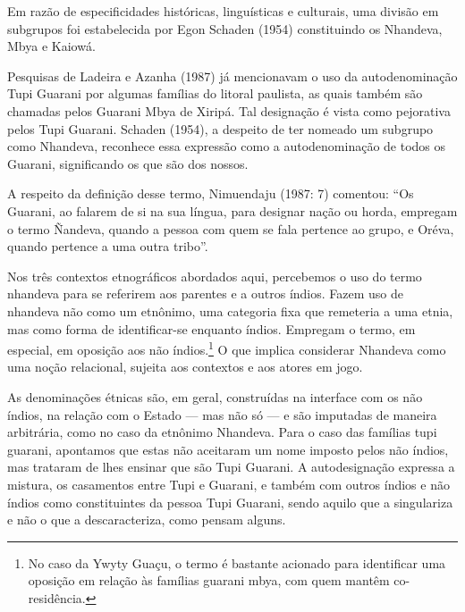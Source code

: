 Em razão de especificidades históricas, linguísticas e culturais, uma
divisão em subgrupos foi estabelecida por Egon Schaden (1954)
constituindo os Nhandeva, Mbya e Kaiowá.

Pesquisas de Ladeira e Azanha (1987) já mencionavam o uso da
autodenominação Tupi Guarani por algumas famílias do litoral paulista,
as quais também são chamadas pelos Guarani Mbya de Xiripá. Tal
designação é vista como pejorativa pelos Tupi Guarani. Schaden (1954),
a despeito de ter nomeado um subgrupo como Nhandeva, reconhece essa
expressão como a autodenominação de todos os Guarani, significando os
que são dos nossos.

A respeito da definição desse termo, Nimuendaju (1987: 7) comentou: ``Os
Guarani, ao falarem de si na sua língua, para designar nação ou horda,
empregam o termo Ñandeva, quando a pessoa com quem se fala pertence ao
grupo, e Oréva, quando pertence a uma outra tribo''.

Nos três contextos etnográficos abordados aqui, percebemos o uso do
termo nhandeva para se referirem aos parentes e a outros índios. Fazem
uso de nhandeva não como um etnônimo, uma categoria fixa que remeteria
a uma etnia, mas como forma de identificar-se enquanto índios. Empregam
o termo, em especial, em oposição aos não índios.\footnote{No caso da
Ywyty Guaçu, o termo é bastante acionado para identificar uma oposição
em relação às famílias guarani mbya, com quem mantêm co-residência.} O
que implica considerar Nhandeva como uma noção relacional, sujeita aos
contextos e aos atores em jogo.

As denominações étnicas são, em geral, construídas na interface com os
não índios, na relação com o Estado --- mas não só --- e são imputadas de
maneira arbitrária, como no caso da etnônimo Nhandeva. Para o caso das
famílias tupi guarani, apontamos que estas não aceitaram um nome
imposto pelos não índios, mas trataram de lhes ensinar que são Tupi
Guarani. A autodesignação expressa a mistura, os casamentos entre Tupi
e Guarani, e também com outros índios e não índios como constituintes
da pessoa Tupi Guarani, sendo aquilo que a singulariza e não o que a
descaracteriza, como pensam alguns.

